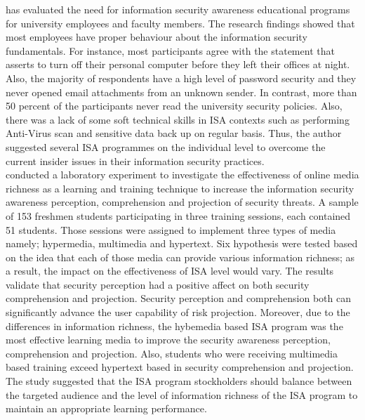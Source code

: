 \citet{Katz2005} has evaluated the need for information security awareness educational programs for university employees and faculty members. The research findings showed that most employees have proper behaviour about the information security fundamentals. For instance, most participants agree with the statement that asserts to turn off their personal computer before they left their offices at night. Also, the majority of respondents have a high level of password security and they never opened email attachments from an unknown sender. In contrast, more than 50 percent of the participants never read the university security policies. Also, there was a lack of some soft technical skills in ISA contexts such as performing Anti-Virus scan and sensitive data back up on regular basis. Thus, the author suggested several ISA programmes on the individual level to overcome the current insider issues in their information security practices.
\\
\citet{Shaw2009} conducted a laboratory experiment to investigate the effectiveness of online media richness as a learning and training technique to increase the information security awareness perception, comprehension and projection of security threats. A sample of 153 freshmen students participating in three training sessions, each contained 51 students. Those sessions were assigned to implement three types of media namely; hypermedia, multimedia and hypertext. Six hypothesis were tested based on the idea that each of those media can provide various information richness; as a result, the impact on the effectiveness of ISA level would vary. The results validate that security perception had a positive affect on both security comprehension and projection. Security perception and comprehension both can significantly advance the user capability of risk projection. Moreover, due to the differences in information richness, the hybemedia based ISA program was the most effective learning media to improve the security awareness perception, comprehension and projection. Also, students who were receiving multimedia based training exceed hypertext based in security comprehension and projection. The study suggested that the ISA program stockholders should balance between the targeted audience and the level of information richness of the ISA program to maintain an appropriate learning performance.
  




